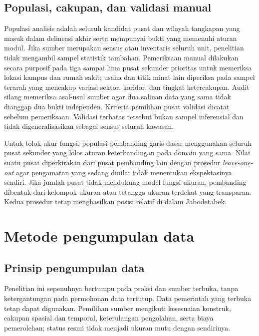 \documentclass[11pt,a4paper,oneside,openany,indonesian]{report}
\begin{document}
\subsection{Populasi, cakupan, dan validasi
manual}\label{populasi-cakupan-dan-validasi-manual}

Populasi analisis adalah seluruh kandidat pusat dan wilayah tangkapan
yang masuk dalam delineasi akhir serta mempunyai bukti yang memenuhi
aturan modul. Jika sumber merupakan sensus atau inventaris seluruh unit,
penelitian tidak mengambil sampel statistik tambahan. Pemeriksaan manual
dilakukan secara purposif pada tiga sampai lima pusat sekunder prioritas
untuk memeriksa lokasi kampus dan rumah sakit; usaha dan titik minat
lain diperiksa pada sampel terarah yang mencakup variasi sektor,
koridor, dan tingkat ketercakupan. Audit silang memeriksa asal-usul
sumber agar dua salinan data yang sama tidak dianggap dua bukti
independen. Kriteria pemilihan pusat validasi dicatat sebelum
pemeriksaan. Validasi terbatas tersebut bukan sampel inferensial dan
tidak digeneralisasikan sebagai sensus seluruh kawasan.

Untuk tolok ukur fungsi, populasi pembanding garis dasar menggunakan
seluruh pusat sekunder yang lolos aturan keterbandingan pada domain yang
sama. Nilai suatu pusat diperkirakan dari pusat pembanding lain dengan
prosedur \emph{leave-one-out} agar pengamatan yang sedang dinilai tidak
menentukan ekspektasinya sendiri. Jika jumlah pusat tidak mendukung model
fungsi-ukuran, pembanding dibentuk dari kelompok ukuran atau tetangga
ukuran terdekat yang transparan. Kedua prosedur tetap menghasilkan
posisi relatif di dalam Jabodetabek.

\section{Metode pengumpulan data}\label{metode-pengumpulan-data}

\subsection{Prinsip pengumpulan
data}\label{prinsip-pengumpulan-data}

Penelitian ini sepenuhnya bertumpu pada proksi dan sumber terbuka, tanpa
ketergantungan pada permohonan data tertutup. Data pemerintah yang
terbuka tetap dapat digunakan. Pemilihan sumber mengikuti kesesuaian
konstruk, cakupan spasial dan temporal, keterulangan pengolahan, serta
biaya pemerolehan; status resmi tidak menjadi ukuran mutu dengan
sendirinya.
\end{document}
